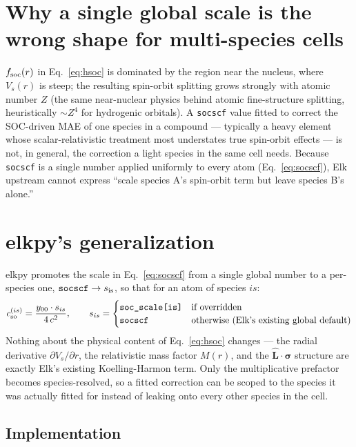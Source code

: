 \documentclass[11pt]{article}
\begin{document}
\section{Why a single global scale is the wrong shape for multi-species cells}

$f_{\rm soc}(r)$ in Eq.~\eqref{eq:hsoc} is dominated by the region near the nucleus,
where $V_s(r)$ is steep; the resulting spin-orbit splitting grows strongly with atomic
number $Z$ (the same near-nuclear physics behind atomic fine-structure splitting,
heuristically $\sim Z^4$ for hydrogenic orbitals). A \texttt{socscf} value fitted to
correct the SOC-driven MAE of one species in a compound — typically a heavy element
whose scalar-relativistic treatment most understates true spin-orbit effects — is not,
in general, the correction a light species in the same cell needs. Because
\texttt{socscf} is a single number applied uniformly to every atom
(Eq.~\eqref{eq:socscf}), Elk upstream cannot express ``scale species A's spin-orbit
term but leave species B's alone.''

\section{elkpy's generalization}

elkpy promotes the scale in Eq.~\eqref{eq:socscf} from a single global number to a
per-species one, $\texttt{socscf} \to s_{\rm is}$, so that for an atom of species $is$:
\begin{equation}
  c_{\rm so}^{(is)} = \frac{y_{00}\cdot s_{is}}{4\,c^2}, \qquad
  s_{is} = \begin{cases}
    \texttt{soc\_scale[is]} & \text{if overridden}\\
    \texttt{socscf} & \text{otherwise (Elk's existing global default)}
  \end{cases}
  \label{eq:persp}
\end{equation}
Nothing about the physical content of Eq.~\eqref{eq:hsoc} changes — the radial
derivative $\partial V_s/\partial r$, the relativistic mass factor $M(r)$, and the
$\hat{\mathbf L}\cdot\boldsymbol\sigma$ structure are exactly Elk's existing
Koelling-Harmon term. Only the multiplicative prefactor becomes species-resolved, so a
fitted correction can be scoped to the species it was actually fitted for instead of
leaking onto every other species in the cell.

\subsection{Implementation}
\end{document}
